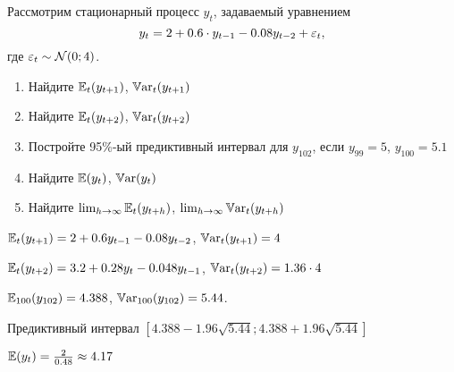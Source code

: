 \begin{problem}

Рассмотрим стационарный процесс $y_t$, задаваемый уравнением
\[
y_t = 2 + 0.6 \cdot y_{t-1} - 0.08 y_{t-2} + \varepsilon_t,
\]
где $\varepsilon_t \sim \mathcal{N}(0; 4)$.

\begin{enumerate}
\item  Найдите $\mathbb{E}_t(y_{t+1})$, $\mathbb{V}\mathrm{ar}_t(y_{t+1})$
\item Найдите $\mathbb{E}_t(y_{t+2})$, $\mathbb{V}\mathrm{ar}_t(y_{t+2})$
\item Постройте 95\%-ый предиктивный интервал для $y_{102}$, если $y_{99}=5$, $y_{100}=5.1$
\item Найдите $\mathbb{E}(y_t)$, $\mathbb{V}\mathrm{ar}(y_t)$
\item Найдите $\lim_{h\to\infty}\mathbb{E}_t(y_{t+h})$, $\lim_{h\to\infty}\mathbb{V}\mathrm{ar}_t(y_{t+h})$
\end{enumerate}


\begin{sol}

$\mathbb{E}_t(y_{t+1})=2+0.6y_{t-1}-0.08y_{t-2}$, $\mathbb{V}\mathrm{ar}_t(y_{t+1})=4$

$\mathbb{E}_t(y_{t+2})=3.2 + 0.28 y_t- 0.048y_{t-1}$, $\mathbb{V}\mathrm{ar}_t(y_{t+2})=1.36 \cdot 4$

$\mathbb{E}_{100}(y_{102})= 4.388$, $\mathbb{V}\mathrm{ar}_{100}(y_{102})=5.44$.

Предиктивный интервал $[4.388 - 1.96 \sqrt{5.44};4.388 + 1.96 \sqrt{5.44}]$

$\mathbb{E}(y_t)=\frac{2}{0.48}\approx 4.17$

\end{sol}
\end{problem}



